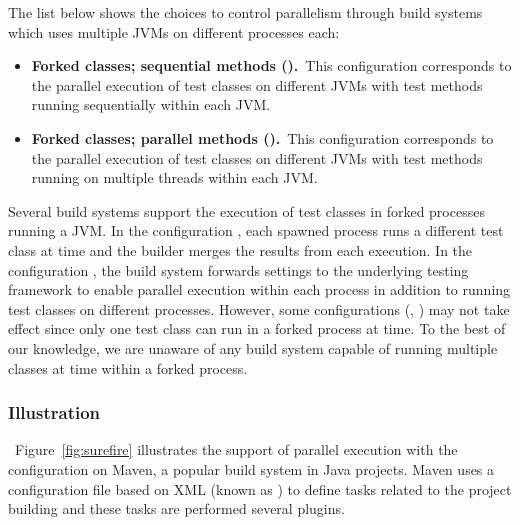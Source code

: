 The list below shows the choices to control parallelism through build
systems which uses multiple JVMs on different processes each:

\begin{itemize}
\item
    \textbf{Forked classes; sequential methods (\ForkSeq).}~This
        configuration corresponds to the parallel execution of test
        classes on different JVMs with test methods running
        sequentially within each JVM.
\item
    \textbf{Forked classes; parallel methods (\ForkParMeth).}~This
        configuration corresponds to the parallel execution of test
        classes on different JVMs with test methods running on
        multiple threads within each JVM.
\end{itemize}

Several build systems support the execution of test classes in forked
processes running a JVM. In the configuration \ForkSeq{}, each spawned
process runs a different test class at time and the builder merges the
results from each execution. In the configuration \ForkParMeth{}, the
build system forwards settings to the underlying testing framework to
enable parallel execution within each process in addition to running
test classes on different processes.  However, some configurations
(\eg, \ParClassSeqMeth) may not take effect since only one test class
can run in a forked process at time.  To the best of our knowledge, we
are unaware of any build system capable of running multiple classes at
time within a forked process.

\subsubsection*{Illustration}~Figure~\ref{fig:surefire} illustrates
the support of parallel execution with the configuration
\ForkParMeth{} on Maven, a popular build system in Java projects.
Maven uses a configuration file based on XML (known as \pomf{}) to
define tasks related to the project building and these tasks are
performed several plugins. 

